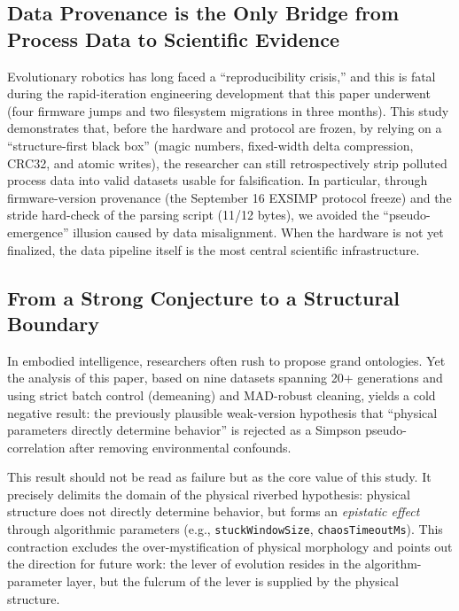 \documentclass[11pt]{article}
\begin{document}
\subsection{Data Provenance is the Only Bridge from Process Data to Scientific Evidence}
Evolutionary robotics has long faced a ``reproducibility crisis,'' and this is fatal during the rapid-iteration engineering development that this paper underwent (four firmware jumps and two filesystem migrations in three months). This study demonstrates that, before the hardware and protocol are frozen, by relying on a ``structure-first black box'' (magic numbers, fixed-width delta compression, CRC32, and atomic writes), the researcher can still retrospectively strip polluted process data into valid datasets usable for falsification. In particular, through firmware-version provenance (the September 16 EXSIMP protocol freeze) and the stride hard-check of the parsing script (11/12 bytes), we avoided the ``pseudo-emergence'' illusion caused by data misalignment. When the hardware is not yet finalized, the data pipeline itself is the most central scientific infrastructure.

\subsection{From a Strong Conjecture to a Structural Boundary}
In embodied intelligence, researchers often rush to propose grand ontologies. Yet the analysis of this paper, based on nine datasets spanning 20+ generations and using strict batch control (demeaning) and MAD-robust cleaning, yields a cold negative result: the previously plausible weak-version hypothesis that ``physical parameters directly determine behavior'' is rejected as a Simpson pseudo-correlation after removing environmental confounds.

This result should not be read as failure but as the core value of this study. It precisely delimits the domain of the physical riverbed hypothesis: physical structure does not directly determine behavior, but forms an \emph{epistatic effect} through algorithmic parameters (e.g., \texttt{stuckWindowSize}, \texttt{chaosTimeoutMs}). This contraction excludes the over-mystification of physical morphology and points out the direction for future work: the lever of evolution resides in the algorithm-parameter layer, but the fulcrum of the lever is supplied by the physical structure.
\end{document}
